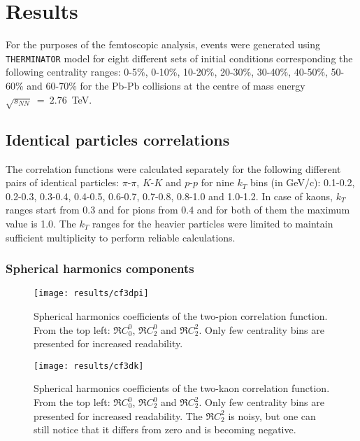 \chapter{Results}
  For the purposes of the femtoscopic analysis, events were generated using \verb|THERMINATOR| model for eight different sets of initial conditions corresponding the following centrality ranges: 0-5\%, 0-10\%, 10-20\%, 20-30\%, 30-40\%, 40-50\%, 50-60\% and 60-70\% for the Pb-Pb collisions at the centre of mass energy $\sqrt{s_{NN}}~=~2.76$~TeV.
  \section{Identical particles correlations}
    The correlation functions were calculated separately for the following different pairs of identical particles: $\pi$-$\pi$, $K$-$K$ and  $p$-$p$ for nine $k_T$ bins (in GeV/c): 0.1-0.2, 0.2-0.3, 0.3-0.4, 0.4-0.5, 0.6-0.7, 0.7-0.8, 0.8-1.0 and 1.0-1.2.
    In case of kaons, $k_T$ ranges start from 0.3 and for pions from 0.4 and for both of them the maximum value is 1.0.
    The $k_T$ ranges for the heavier particles were limited to maintain sufficient multiplicity to perform reliable calculations.
    \subsection{Spherical harmonics components}

      \begin{figure}[h]
        \centering
        \centerline{\texttt{[image: results/cf3dpi]}}
        \caption{Spherical harmonics coefficients of the two-pion correlation function. From the top left: $\Re C^0_0$, $\Re C^0_2$ and $\Re C^2_2$. Only few centrality bins are presented for increased readability.}
      \label{fig:cf3dpi}
      \end{figure}

      \begin{figure}[h]
        \centering
        \centerline{\texttt{[image: results/cf3dk]}}
        \caption{Spherical harmonics coefficients of the two-kaon correlation function. From the top left: $\Re C^0_0$, $\Re C^0_2$ and $\Re C^2_2$. Only few centrality bins are presented for increased readability. The $\Re C^2_2$ is noisy, but one can still notice that it differs from zero and is becoming negative.}
      \label{fig:cf3dk}
      \end{figure} 


